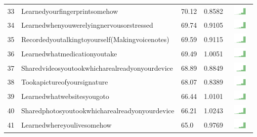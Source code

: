 \documentclass[a4paper,12pt]{article}
\begin{document}
\begin{longtable}{| p{0.5cm} | p{7cm} | p{1cm} |p{1cm} | c |}
33 & Learnedyourfingerprintsomehow & 70.12&0.8582 & \includegraphics[width = 2cm, height = 0.5cm]{tables/learnedyourfingerprintsomehowcombined} \\ 
34 & Learnedwhenyouwerelyingnervousorstressed & 69.74&0.9105 & \includegraphics[width = 2cm, height = 0.5cm]{tables/learnedwhenyouwerelyingnervousorstressedcombined} \\ 
35 & Recordedyoutalkingtoyourself(Makingvoicenotes) & 69.59&0.9115 & \includegraphics[width = 2cm, height = 0.5cm]{tables/recordedyoutalkingtoyourself(makingvoicenotes)combined} \\ 
36 & Learnedwhatmedicationyoutake & 69.49&1.0051 & \includegraphics[width = 2cm, height = 0.5cm]{tables/learnedwhatmedicationyoutakecombined} \\ 
37 & Sharedvideosyoutookwhicharealreadyonyourdevice & 68.89&0.8849 & \includegraphics[width = 2cm, height = 0.5cm]{tables/sharedvideosyoutookwhicharealreadyonyourdevicecombined} \\ 
38 & Tookapictureofyoursignature & 68.07&0.8389 & \includegraphics[width = 2cm, height = 0.5cm]{tables/tookapictureofyoursignaturecombined} \\ 
39 & Learnedwhatwebsitesyougoto & 66.44&1.0101 & \includegraphics[width = 2cm, height = 0.5cm]{tables/learnedwhatwebsitesyougotocombined} \\ 
40 & Sharedphotosyoutookwhicharealreadyonyourdevice & 66.21&1.0243 & \includegraphics[width = 2cm, height = 0.5cm]{tables/sharedphotosyoutookwhicharealreadyonyourdevicecombined} \\ 
41 & Learnedwhereyoulivesomehow & 65.0&0.9769 & \includegraphics[width = 2cm, height = 0.5cm]{tables/learnedwhereyoulivesomehowcombined} \\ 

\end{longtable}
\end{document}
